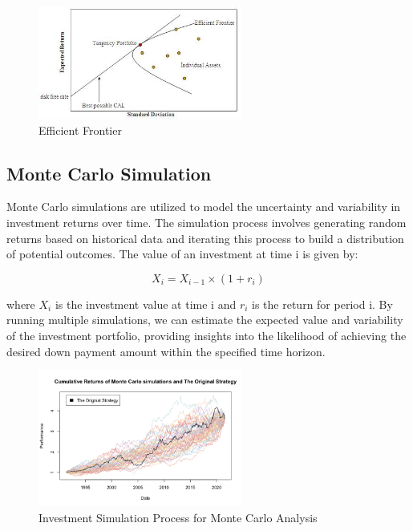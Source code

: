 \begin{figure}[h!]
    \centering
    \includegraphics[width=0.6\textwidth]{../Figures/efficient_frontier.png}
    \caption{Efficient Frontier}
    \label{fig:efficient_frontier}
\end{figure}

\subsection{Monte Carlo Simulation}
Monte Carlo simulations are utilized to model the uncertainty and variability in investment returns over time. The simulation process involves generating random returns based on historical data and iterating this process to build a distribution of potential outcomes. The value of an investment at time i is given by:

\begin{equation}
X_i = X_{i-1} \times (1 + r_i)
\end{equation}

where $X_i$ is the investment value at time i and $r_i$ is the return for period i. By running multiple simulations, we can estimate the expected value and variability of the investment portfolio, providing insights into the likelihood of achieving the desired down payment amount within the specified time horizon.

\begin{figure}[h!]
    \centering
    \includegraphics[width=0.6\textwidth]{../Figures/investment_simulation_process.png}
    \caption{Investment Simulation Process for Monte Carlo Analysis}
    \label{fig:investment_simulation}
\end{figure}

\newpage
